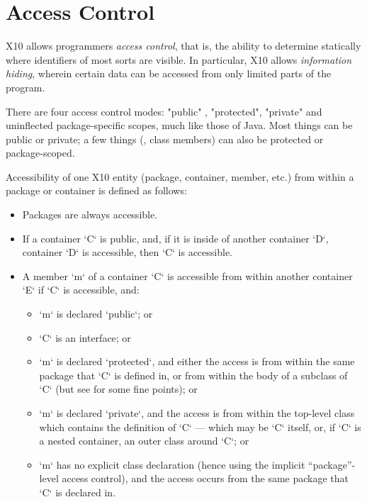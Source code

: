 \section{Access Control}

X10 allows programmers {\em access control}, that is, the ability to determine
statically where identifiers of most sorts are visible.  In particular, X10
allows {\em information hiding}, wherein certain data can be accessed from
only limited parts of the program. 

There are four access control modes: 
\xcd"public" , \xcd"protected", \xcd"private"
and uninflected package-specific scopes, much like those of Java. 
Most things can be public or private; a few things (\eg, class members) can
also be protected or package-scoped.  

Accessibility of one X10 entity (package, container, member, etc.) from within
a package or container is defined as follows: 
\begin{itemize}
\item Packages are always accessible.
\item If a container \xcd`C` is public, and, if it is inside of another
      container \xcd`D`,
      container \xcd`D` is accessible, then \xcd`C` is accessible.  
\item A member \xcd`m` of a container \xcd`C` is accessible from within
      another container  \xcd`E`
      if \xcd`C` is
      accessible, and: 
      \begin{itemize}
      \item \xcd`m` is declared \xcd`public`; or
      \item \xcd`C` is an interface; or
      \item \xcd`m` is declared \xcd`protected`, and either the access is from
            within the same package that \xcd`C` is defined in, or from within
            the body of a subclass of \xcd`C` (but see
             for some fine points); or
      \item \xcd`m` is declared \xcd`private`, and the access is from within
            the top-level class which contains the definition of \xcd`C` ---
            which may be \xcd`C` itself, or, if \xcd`C` is a nested container, an
            outer class around \xcd`C`; or
      \item \xcd`m` has no explicit class declaration (hence using the
            implicit ``package''-level access control), and the access occurs
            from the same package that \xcd`C` is declared in.
      \end{itemize}
\end{itemize}

